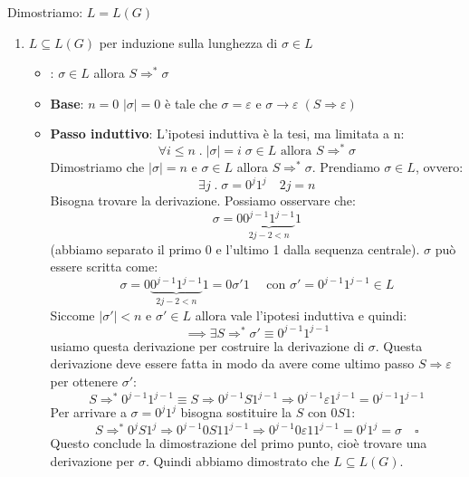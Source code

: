\documentclass[a4paper]{article}
\begin{document}
\begin{example}
  \vspace{1em}
  \noindent
  Dimostriamo: \( L = L(G) \) 
  \begin{enumerate}
    \item \( L \subseteq L(G) \) per induzione sulla lunghezza di \( \sigma \in L \)
      \begin{itemize}
        \item {}: \( \sigma \in L \) allora \( S \Rightarrow^* \sigma \)
        \item \textbf{Base}: \( n = 0 \) \( |\sigma| = 0 \) è tale che \( \sigma = \varepsilon  \) 
          e \( \sigma  \to \varepsilon \; (S \Rightarrow \varepsilon ) \) 
        \item \textbf{Passo induttivo}: L'ipotesi induttiva è la tesi, ma limitata a n:
          \[
            \forall i \le n \;.\; |\sigma| = i \; \sigma \in L \text{ allora } S \Rightarrow^* \sigma
          \] 
          Dimostriamo che \( |\sigma| = n \) e \( \sigma \in L \) allora \( S \Rightarrow^* \sigma \).
          Prendiamo \( \sigma \in L \), ovvero:
          \[
            \exists j \;.\; \sigma = 0^j 1^j \quad 2j = n
          \] 
          Bisogna trovare la derivazione. Possiamo osservare che:
          \[ \sigma = 0 \underbrace{0^{j-1} 1^{j-1}}_{2j-2 < n} 1 \]
          (abbiamo separato il primo 0 e l'ultimo 1 dalla
          sequenza centrale). \( \sigma  \) può essere scritta come:
          \[
            \sigma = 0 \underbrace{0^{j-1} 1^{j-1}}_{2j-2 < n} 1
            = 0 \sigma' 1 \quad \text{ con } \sigma' = 0^{j-1} 1^{j-1} \in L
          \]
          Siccome \( \left| \sigma' \right| < n \) e \( \sigma' \in L \) allora vale
          l'ipotesi induttiva e quindi:
          \[
            \implies \exists S \Rightarrow^* \sigma' \equiv 0^{j-1} 1^{j-1}
          \] 
          usiamo questa derivazione per costruire la derivazione di \( \sigma \).
          Questa derivazione deve essere fatta in modo da avere come ultimo passo
          \( S \Rightarrow \varepsilon \) per ottenere \( \sigma' \):
          \[
            S \Rightarrow^* 0^{j-1} 1^{j-1} \equiv
            S \Rightarrow 0^{j-1} S 1^{j-1} \Rightarrow 0^{j-1} \varepsilon 1^{j-1}
            = 0^{j-1} 1^{j-1}
          \] 
          Per arrivare a \(\sigma = 0^j 1^j \) bisogna sostituire la \( S \) con \( 0 S 1 \):
          \[
            S \Rightarrow^* 0^j S 1^j \Rightarrow 0^{j-1} 0 S 1 1^{j-1} \Rightarrow
            0^{j-1} 0 \varepsilon 1 1^{j-1} = 0^j 1^j = \sigma \quad \square
          \] 
          Questo conclude la dimostrazione del primo punto, cioè trovare una derivazione
          per \( \sigma \). Quindi abbiamo dimostrato che \( L \subseteq L(G) \).
      \end{itemize}


\end{enumerate}
\end{example}
\end{document}
